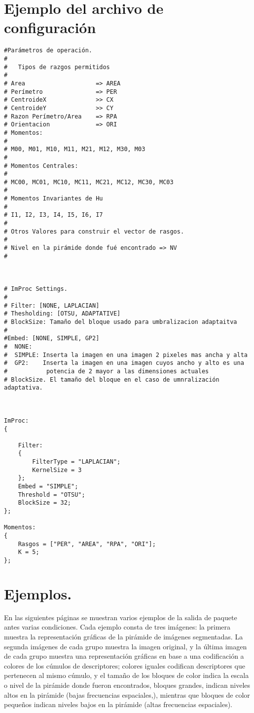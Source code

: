 \documentclass[12pt,letterpaper,notitlepage]{report}
\newlength{\spacing} \setlength{\spacing}{\baselineskip}
\newcommand{\nspace}[1]{\setlength{\baselineskip}{#1\spacing}}
\newenvironment{linespacing}[1]{\nspace{#1}}{}
\begin{document}
{\begin{linespacing}{1.5}
\section{Ejemplo del archivo de configuración}
\label{sec:config++}

\begin{verbatim}
#Parámetros de operación.
#
#   Tipos de razgos permitidos
#
# Area                    => AREA 
# Perímetro               => PER
# CentroideX              >> CX
# CentroideY              >> CY
# Razon Perímetro/Area    => RPA
# Orientacion             => ORI
# Momentos:
#
# M00, M01, M10, M11, M21, M12, M30, M03
#
# Momentos Centrales:
#
# MC00, MC01, MC10, MC11, MC21, MC12, MC30, MC03
#
# Momentos Invariantes de Hu
#
# I1, I2, I3, I4, I5, I6, I7
#
# Otros Valores para construir el vector de rasgos.
# 
# Nivel en la pirámide donde fué encontrado => NV
#



# ImProc Settings.
#
# Filter: [NONE, LAPLACIAN]
# Thesholding: [OTSU, ADAPTATIVE]
# BlockSize: Tamaño del bloque usado para umbralizacion adaptaitva
#
#Embed: [NONE, SIMPLE, GP2]
#  NONE:   
#  SIMPLE: Inserta la imagen en una imagen 2 pixeles mas ancha y alta
#  GP2:    Inserta la imagen en una imagen cuyos ancho y alto es una
#           potencia de 2 mayor a las dimensiones actuales
# BlockSize. El tamaño del bloque en el caso de umnralización adaptativa.



ImProc:
{

    Filter:
    {
        FilterType = "LAPLACIAN";
        KernelSize = 3
    };
    Embed = "SIMPLE";
    Threshold = "OTSU"; 
    BlockSize = 32;
};

Momentos:
{
    Rasgos = ["PER", "AREA", "RPA", "ORI"]; 
    K = 5;
};

\end{verbatim}
\newpage
\section{Ejemplos.}

En las siguientes páginas se muestran varios ejemplos de la salida de paquete antes varias condiciones. Cada ejemplo consta de tres imágenes: la primera muestra la representación gráficas de la pirámide de imágenes segmentadas. La segunda imágenes de cada grupo muestra la imagen original, y la última imagen de cada grupo muestra una representación gráficas en base a una codificación a colores de los cúmulos de descriptores; colores iguales codifican descriptores que pertenecen al mismo cúmulo, y el tamaño de los bloques de color indica la escala o nivel de la pirámide donde fueron encontrados, bloques grandes, indican niveles altos en la pirámide (bajas frecuencias espaciales,), mientras que bloques de color pequeños indican niveles bajos en la pirámide (altas frecuencias espaciales).


\end{linespacing}}
\end{document}
